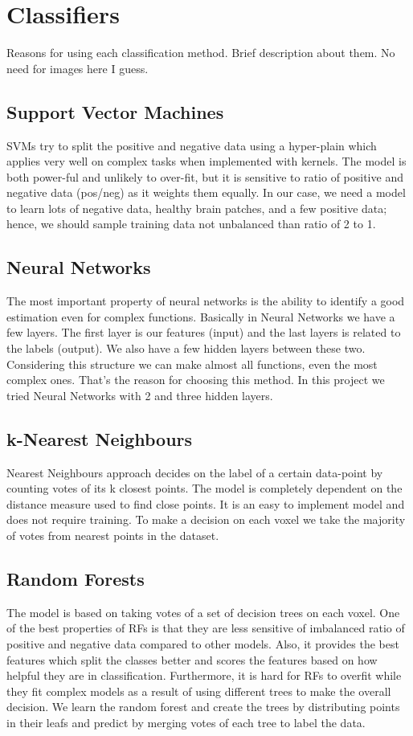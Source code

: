\documentclass{article} %
\begin{document}
\section{Classifiers}

Reasons for using each classification method. Brief description about them. No need for images here I guess.  

\subsection{Support Vector Machines} 
SVMs try to split the positive and negative data using a hyper-plain which applies very well on complex tasks when implemented with kernels. The model is both power-ful and unlikely to over-fit, but it is sensitive to ratio of positive and negative data (pos/neg) as it weights them equally. In our case, we need a model to learn lots of negative data, healthy brain patches, and a few positive data; hence, we should sample training data not unbalanced than ratio of 2 to 1.

\subsection{ Neural Networks} 
The most important property of neural networks is the ability to identify a good estimation even for complex functions. Basically in Neural Networks we have a few layers. The first layer is our features (input) and the last layers is related to the labels (output). We also have a few hidden layers between these two. Considering this structure we can make almost all functions, even the most complex ones. That’s the reason for choosing this method. In this project we tried Neural Networks with 2 and three hidden layers.

\subsection{k-Nearest Neighbours} 
Nearest Neighbours approach decides on the label of a certain data-point by counting votes of its k closest points. The model is completely dependent on the distance measure used to find close points. It is an easy to implement model and does not require training. To make a decision on each voxel we take the majority of votes from nearest points in the dataset. 

\subsection{Random Forests} 
The model is based on taking votes of a set of decision trees on each voxel. One of the best properties of RFs is that they are less sensitive of imbalanced ratio of positive and negative data compared to other models. Also, it provides the best features which split the classes better and scores the features based on how helpful they are in classification. Furthermore, it is hard for RFs to overfit while they fit complex models as a result of using different trees to make the overall decision. We learn the random forest and create the trees by distributing points in their leafs and predict by merging votes of each tree to label the data.
\end{document}
